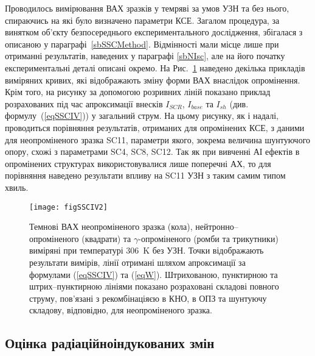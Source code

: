 Проводилось вимірювання ВАХ зразків у темряві за умов УЗН та без нього, спираючись на які було визначено параметри КСЕ.
Загалом процедура, за винятком об'єкту безпосереднього експериментального дослідження,
збігалася з описаною у параграфі~\ref{sbSSCMethod}.
Відмінності мали місце лише при отриманні результатів, наведених у параграфі \ref{sbNIsc},
але на його початку експериментальні деталі описані окремо.
На Рис.~\ref{figSSCIV2} наведено декілька прикладів виміряних кривих, які відображають
зміну форми ВАХ внаслідок опромінення.
Крім того, на рисунку за допомогою розривних ліній показано приклад розрахованих під час апроксимації внесків $I_{SCR}$, $I_{base}$ та $I_{sh}$
(див. формулу~(\ref{eqSSCIV})) у загальний струм.
На цьому рисунку, як і надалі, проводиться порівняння результатів,
отриманих для опромінених КСЕ, з даними для неопроміненого зразка SC11, параметри якого, зокрема величина шунтуючого опору,
схожі з параметрами SC4, SC8, SC12.
Так як при вивченні АІ ефектів в опромінених структурах використовувалися лише поперечні АХ,
то для порівняння наведено результати впливу на SC11 УЗН з таким самим типом хвиль.

\begin{figure}
\center
\texttt{[image: figSSCIV2]}%
\caption{\label{figSSCIV2}
Темнові ВАХ неопроміненого зразка (кола), нейтронно--опроміненого (квадрати) та $\gamma$-опроміненого (ромби та трикутники) виміряні при температурі 306~K без УЗН.
Точки відображають результати вимірів, лінії отримані шляхом апроксимації за формулами (\ref{eqSSCIV}) та (\ref{eqW}).
Штрихованою, пунктирною та штрих--пунктирною лініями показано розраховані складові повного струму, пов'язані з рекомбінаціяєю в КНО, в ОПЗ та шунтуючу складову, відповідно,
для неопроміненого зразка.
}%
\end{figure}



\subsection{Оцінка радіаційноіндукованих змін\label{sbRadDefCreate}}

